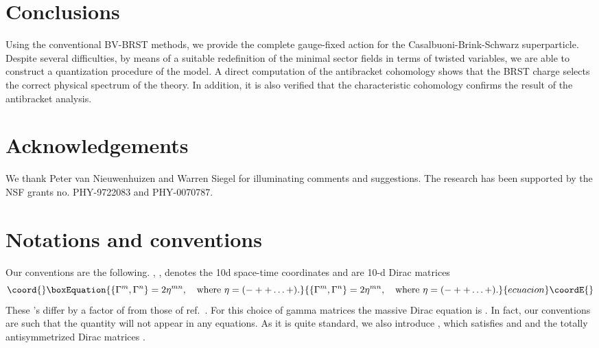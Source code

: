 \documentclass[a4paper,12pt]{article}
\begin{document}
\section{Conclusions}

Using the conventional BV-BRST methods, we provide the complete
gauge-fixed action for the Casalbuoni-Brink-Schwarz superparticle.
Despite several difficulties, by means of a suitable redefinition of
the minimal sector fields in terms of twisted variables, we are able
to construct a quantization procedure of the model. A direct
computation of the antibracket cohomology shows that the BRST charge
selects the correct physical spectrum of the theory. In addition, it
is also verified that the characteristic cohomology
\coordHE{} confirms the result of the antibracket analysis.

\section*{Acknowledgements}
\noindent
We thank Peter van Nieuwenhuizen and Warren Siegel for illuminating
comments and suggestions. The research has been supported by the NSF
grants no. PHY-9722083 and PHY-0070787.


\appendix

\section{Notations and conventions}
\label{app:notations}

Our conventions are the following.  \coordHE{}, \coordHE{},
denotes the 10d 
space-time coordinates and \coordHE{} are 10-d Dirac matrices 
\begin{equation}\coord{}\boxEquation{
\{\Gamma^m, \Gamma^n\} = 2\eta^{mn}, \quad {\rm where}~ \eta = (- ++ \ldots +).
}{
\{\Gamma^m, \Gamma^n\} = 2\eta^{mn}, \quad {\rm where}~ \eta = (- ++ \ldots +).
}{ecuacion}\coordE{}\end{equation}
These \myHighlight{$\Gamma$}\coordHE{}'s differ by a factor of \coordHE{} from those of
ref.~\cite{green3}.  For this choice of gamma matrices the massive
Dirac equation is \coordHE{}.  In fact, our
conventions are such that the quantity \coordHE{} will not appear
in any equations. As it is quite standard, we also introduce
\coordHE{}, which satisfies
\coordHE{} and \coordHE{} and
the totally antisymmetrized Dirac matrices \coordHE{}.
\end{document}
